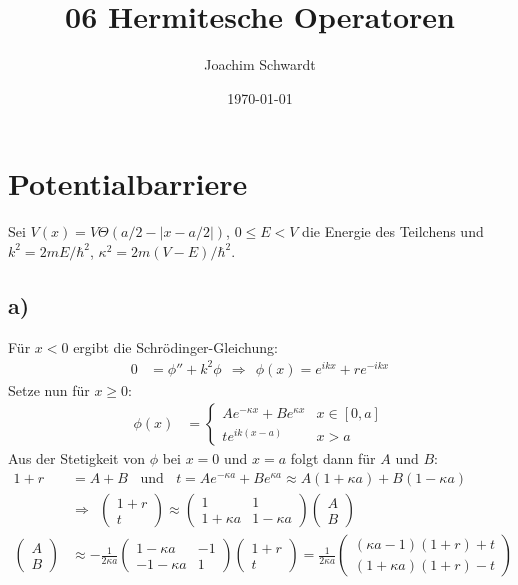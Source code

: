 \documentclass[a4paper,12pt]{article}
\begin{document}
\title{06 Hermitesche Operatoren}
\author{Joachim Schwardt}
\date{\today}
\maketitle

\section{Potentialbarriere}
Sei $V(x)=V\Theta (a/2-|x-a/2|)$, $0\le E<V$ die Energie des Teilchens und $k^2=2mE/\hbar^2$, $\kappa^2=2m(V-E)/\hbar^2$.
\subsection*{a)}
Für $x<0$ ergibt die Schrödinger-Gleichung:
\begin{align*}
0&=\phi''+k^2\phi\ \ \Rightarrow\ \ \phi(x)=e^{ikx}+re^{-ikx}
\end{align*}
Setze nun für $x\ge 0$:
\begin{align*}
\phi(x)&=\left\{\begin{matrix}
Ae^{-\kappa x}+Be^{\kappa x} & x\in [0,a] \\
te^{ik(x-a)} & x> a
\end{matrix}\right.
\end{align*}
Aus der Stetigkeit von $\phi$ bei $x=0$ und $x=a$ folgt dann für $A$ und $B$:
\begin{align*}
1+r&=A+B\ \ \ \ \mathrm{und}\ \ \ \ t=Ae^{-\kappa a}+Be^{\kappa a}\approx A(1+\kappa a) + B(1-\kappa a) \\
&\Rightarrow\ \ \begin{pmatrix}
1+r \\ t
\end{pmatrix}\approx\begin{pmatrix}
1 & 1 \\
1+\kappa a & 1-\kappa a
\end{pmatrix}\begin{pmatrix}
A \\ B
\end{pmatrix}\\ 
\begin{pmatrix}
A \\ B
\end{pmatrix} &\approx-\frac{1}{2\kappa a}\begin{pmatrix}
1-\kappa a & -1 \\ 
-1-\kappa a & 1
\end{pmatrix}\begin{pmatrix}
1+r \\ t
\end{pmatrix}=\frac{1}{2\kappa a}\begin{pmatrix}
(\kappa a-1)(1+r)+t \\ (1+\kappa a)(1+r)-t
\end{pmatrix}
\end{align*}
\end{document}
